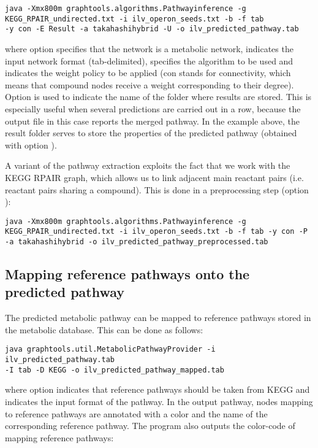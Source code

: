 \begin{verbatim}
java -Xmx800m graphtools.algorithms.Pathwayinference -g
KEGG_RPAIR_undirected.txt -i ilv_operon_seeds.txt -b -f tab  
-y con -E Result -a takahashihybrid -U -o ilv_predicted_pathway.tab
\end{verbatim}

where option  specifies that the network is a metabolic
network,  indicates the input network format (tab-delimited),
 specifies the algorithm to be used and  indicates the
weight policy to be applied (con stands for connectivity, which means that
compound nodes receive a weight corresponding to their degree). 
Option  is used to indicate the name of the folder where results are
stored. This is especially useful when several predictions are carried out in a
row, because the output file in this case reports the merged pathway. In the
example above, the result folder serves to store the properties of
the predicted pathway (obtained with option ).

A variant of the pathway extraction exploits the fact that we work with the
KEGG RPAIR graph, which allows us to link adjacent main reactant pairs (i.e.
reactant pairs sharing a compound). This is done in a preprocessing step
(option ):

\begin{verbatim}
java -Xmx800m graphtools.algorithms.Pathwayinference -g
KEGG_RPAIR_undirected.txt -i ilv_operon_seeds.txt -b -f tab -y con -P 
-a takahashihybrid -o ilv_predicted_pathway_preprocessed.tab
\end{verbatim}

\subsection{Mapping reference pathways onto the predicted pathway}

The predicted metabolic pathway can be mapped to reference pathways stored in
the metabolic database. This can be done as follows:

\begin{verbatim}
java graphtools.util.MetabolicPathwayProvider -i ilv_predicted_pathway.tab 
-I tab -D KEGG -o ilv_predicted_pathway_mapped.tab
\end{verbatim}

where option  indicates that reference pathways should be taken from
KEGG and  indicates the input format of the pathway. In the output
pathway, nodes mapping to reference pathways are annotated with
a color and the name of the corresponding reference pathway. 
The program  also outputs the color-code of mapping reference pathways:

